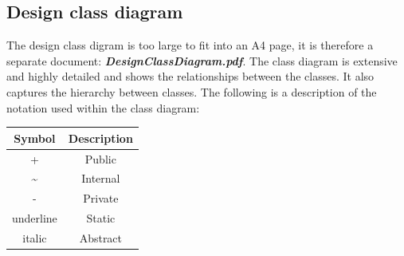 \documentclass[11pt,a4paper]{article}
\begin{document}
\subsection{Design class diagram}
The design class digram is too large to fit into an A4 page, it is therefore a separate document: \textit{\textbf{DesignClassDiagram.pdf}}. The class diagram is extensive and highly detailed and shows the relationships between the classes. It also captures the hierarchy between classes. The following is a description of the notation used within the class diagram:
\begin{center}
    \begin{tabular}{|c|c|}
        \hline
        \textbf{Symbol} & \textbf{Description} \\
        \hline
        + & Public \\
        \textasciitilde  & Internal \\
        - & Private \\
        underline & Static \\
        italic & Abstract \\
        \hline
    \end{tabular}    
\end{center}
\end{document}
